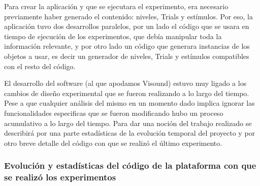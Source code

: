 \documentclass{article}
\begin{document}
    Para crear la aplicación y que se ejecutara el experimento, era necesario previamente haber generado el contenido: niveles, Trials y estímulos. Por eso, la aplicación tuvo dos desarrollos paralelos, por un lado el código que se usara en tiempo de ejecución de los experimentos, que debía manipular toda la información relevante, y por otro lado un código que generara instancias de los objetos a usar, es decir un generador de niveles, Trials y estímulos compatibles con el resto del código.
    
    El desarrollo del software (al que apodamos Visound) estuvo muy ligado a los cambios de diseño experimental que se fueron realizando a lo largo del tiempo. Pese a que cualquier análisis del mismo en un momento dado implica ignorar las funcionalidades especificas que se fueron modificando hubo un proceso acumulativo a lo largo del tiempo. Para dar una noción del trabajo realizado se describirá por una parte estadísticas de la evolución temporal del proyecto y por otro breve detalle del código con que se realizó el último experimento. 
    
    \subsubsection{Evolución y estadísticas del código de la plataforma con que se realizó los experimentos}
    
\end{document}
